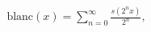 \documentclass[preview]{standalone}
\begin{document}
\begin{align*}
\text{blanc}(x) = \sum_{n=0}^{\infty} \frac{s(2^n x)}{2^n},
\end{align*}
\end{document}

